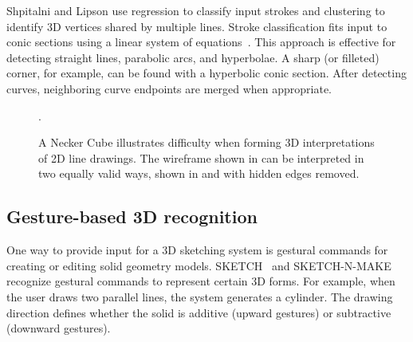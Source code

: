 Shpitalni and Lipson use regression to classify input strokes and
clustering to identify 3D vertices shared by multiple lines. Stroke
classification fits input to conic sections using a linear system of
equations~\cite{shpitalni-curve-fitting}.  This approach is effective
for detecting straight lines, parabolic arcs, and hyperbolae. A sharp
(or filleted) corner, for example, can be found with a hyperbolic
conic section. After detecting curves, neighboring curve endpoints are
merged when appropriate.

\begin{figure}
\begin{center}
\caption{A Necker Cube illustrates difficulty when forming 3D 
         interpretations of 2D line drawings. The wireframe shown
         in  can be interpreted in two
         equally valid ways, shown in 
         and  with hidden edges removed.}.
\label{fig:necker}
\end{center}
\end{figure}

\subsection{Gesture-based 3D recognition}

One way to provide input for a 3D sketching system is gestural
commands for creating or editing solid geometry models.
SKETCH~\cite{zeleznik-sketch} and
SKETCH-N-MAKE~\cite{bloomenthal-sketch-n-make} recognize gestural
commands to represent certain 3D forms. For example, when the user
draws two parallel lines, the system generates a cylinder. The drawing
direction defines whether the solid is additive (upward gestures) or
subtractive (downward gestures).

